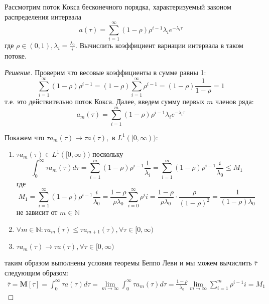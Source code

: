 \documentclass[12pt,a4paper]{article}
\author{Самутичев Е.Р.}
\date{\today}
\title{}
\newcommand{\mean}[1]{\mathbf{M}[#1]}
\begin{document}
	
\maketitle

\begin{exercise}[Задача 6]
	Рассмотрим поток Кокса бесконечного порядка, характеризуемый законом распределения интервала
	$$a(\tau) = \sum_{i=1}^{\infty}{(1 - \rho)\rho^{i-1} \lambda_i e^{-\lambda_i \tau}}$$
	где $\rho \in (0, 1), \lambda_i = \frac{\lambda_0}{i}$. Вычислить коэффициент вариации интервала в таком потоке.
\end{exercise}
\begin{proof}[Решение]
	Проверим что весовые коэффициенты в сумме равны 1:
	$$\sum_{i=1}^{\infty}{(1-\rho)\rho^{i-1}} = (1-\rho)\sum_{i=1}^{\infty}{\rho^{i-1}} = (1-\rho)\frac{1}{1 - \rho} = 1$$
	т.е. это действительно поток Кокса. Далее, введем сумму первых $m$ членов ряда: 
	$$a_m (\tau) = \sum_{i=1}^{m}{(1-\rho)\rho^{i-1} \lambda_i e^{-\lambda_i \tau}}$$
	
	Покажем что $\tau a_m (\tau) \to \tau a (\tau), \text{ в } L^1 ([0, \infty))$: 
	\begin{enumerate}
		\item $\tau a_m (\tau) \in L^1 ([0, \infty))$ поскольку
		$$\int_{0}^{\infty}{\tau a_m  (\tau) d\tau} = \sum_{i=1}^{m}{(1 - \rho)\rho^{i-1} \frac{1}{\lambda_i}} = \sum_{i=1}^{m}{(1-\rho)\rho^{i-1} \frac{i}{\lambda_0}} \leq M_1$$
		где
		$$M_1 =\sum_{i=1}^{\infty}{(1-\rho)\rho^{i-1} \frac{i}{\lambda_0}} = \frac{1-\rho}{\rho \lambda_0} \sum_{i=0}^{\infty}{\rho^i i} = \frac{1-\rho}{\rho\lambda_0} \cdot \frac{\rho}{(1-\rho)^2} = \frac{1}{(1-\rho)\lambda_0}$$
		не зависит от $m \in \mathbb{N}$
		\item $\forall m \in \mathbb{N}: \tau a_m (\tau) \leq \tau a_{m+1} (\tau), \forall \tau \in [0, \infty)$
		\item $\tau a_m (\tau) \to \tau a (\tau), \forall \tau \in [0, \infty)$ 
	\end{enumerate}
	таким образом выполнены условия теоремы Беппо Леви и мы можем вычислить $\bar{\tau}$ следующим образом:
	\begin{multline*}
		\bar{\tau} = \mean{\tau} = \int_{0}^{\infty}{\tau a(\tau) d\tau} = \lim_{m\to \infty}{\int_{0}^{\infty}{\tau a_m(\tau) d\tau}} = \frac{1-\rho}{\lambda_0}\lim_{m\to\infty}{\sum_{i=1}^{m}{\rho^{i-1} i}} = M_1
	\end{multline*}
	

\end{proof}
\end{document}
